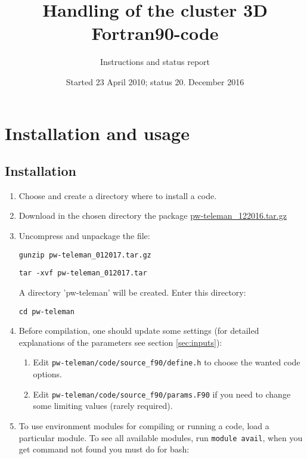 \documentclass[12pt]{article}
\begin{document}
\title{Handling of the cluster 3D Fortran90-code}
\author{Instructions and status report}
\date{Started 23 April 2010; status 20. December 2016}
\maketitle

\tableofcontents
\newpage

\section{Installation and usage}
\pagestyle{headings}
\subsection{Installation}

\begin{enumerate}
\item Choose and create a directory where to install a code.
\item Download in the chosen directory the package \href{http://redmine.pw-teleman.org/projects/pw-teleman/files}{pw-teleman\_122016.tar.gz}  
\item Uncompress and unpackage the file:

\hspace*{1cm}
{\tt gunzip pw-teleman\_012017.tar.gz}

\hspace*{1cm}
{\tt tar -xvf pw-teleman\_012017.tar}

A directory 'pw-teleman' will be created. Enter this directory:

\hspace*{1cm}
{\tt cd pw-teleman}


\item Before compilation, one should update some settings
(for detailed explanations of the parameters see section \ref{sec:inputs}):
\begin{enumerate}
\item
 Edit {\tt pw-teleman/code/source\_f90/define.h} to choose the wanted code options.
\item
 Edit {\tt pw-teleman/code/source\_f90/params.F90} if you need to change some limiting values
 (rarely required).
\end{enumerate}

\item To use environment modules for compiling or running a code, load a particular module. To see all available modules, run {\tt module avail}, when you get command not found you must do for bash:


\end{enumerate}
\end{document}
